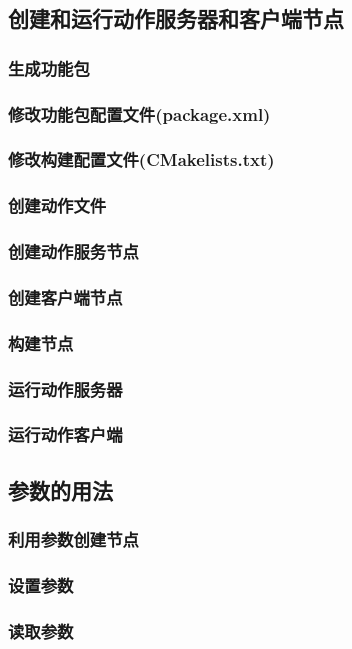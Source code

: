 \documentclass[geye,green,kindle,cn]{elegantnote}
\begin{document}
\subsection{创建和运行动作服务器和客户端节点}
\subsubsection{生成功能包}
\subsubsection{修改功能包配置文件(package.xml)}
\subsubsection{修改构建配置文件(CMakelists.txt)}
\subsubsection{创建动作文件}
\subsubsection{创建动作服务节点}
\subsubsection{创建客户端节点}
\subsubsection{构建节点}
\subsubsection{运行动作服务器}
\subsubsection{运行动作客户端}
\subsection{参数的用法}
\subsubsection{利用参数创建节点}
\subsubsection{设置参数}
\subsubsection{读取参数}
\end{document}
